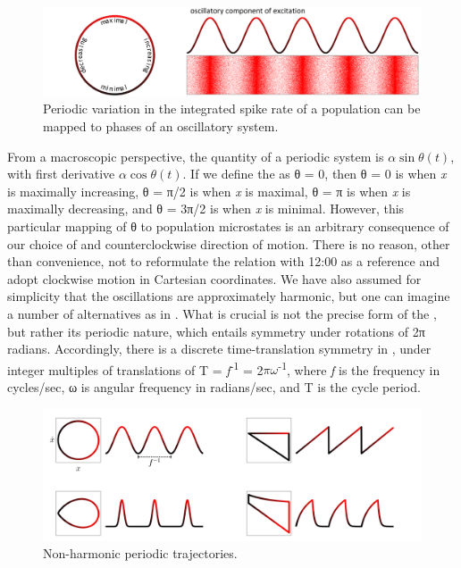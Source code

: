   
\begin{figure}
\includegraphics[width=\textwidth]{figures/Tilsen-img46.png}
\caption{Periodic variation in the integrated spike rate of a population can be mapped to phases of an oscillatory system.}
\label{fig:3:18}
\end{figure}
 

  From a macroscopic perspective, the  quantity of a periodic system is {$\alpha \sin{θ(t)}$}, with first derivative {$\alpha \cos{θ(t)}$}. If we define the  as θ = 0, then θ = 0 is when \textit{x} is maximally increasing, θ = π/2 is when \textit{x} is maximal, θ = π is when \textit{x} is maximally decreasing, and θ = 3π/2 is when \textit{x} is minimal. However, this particular mapping of θ to population microstates is an arbitrary consequence of our choice of  and counterclockwise direction of motion. There is no reason, other than convenience, not to reformulate the relation with 12:00 as a reference and adopt clockwise motion in Cartesian coordinates. We have also assumed for simplicity that the oscillations are approximately harmonic, but one can imagine a number of alternatives as in {}. What is crucial is not the precise form of the , but rather its periodic nature, which entails symmetry under rotations of 2π radians. Accordingly, there is a discrete time-translation symmetry in , under integer multiples of translations of T = \textit{f}\textsuperscript{{}-1} = 2$\pi \omega $\textsuperscript{{}-1}, where \textit{f} is the frequency in cycles/sec, ω is angular frequency in radians/sec, and T is the cycle period.

  
\begin{figure}
\includegraphics[width=\textwidth]{figures/Tilsen-img47.png}
\caption{Non-harmonic periodic trajectories.}
\label{fig:3:19}
\end{figure}
 

